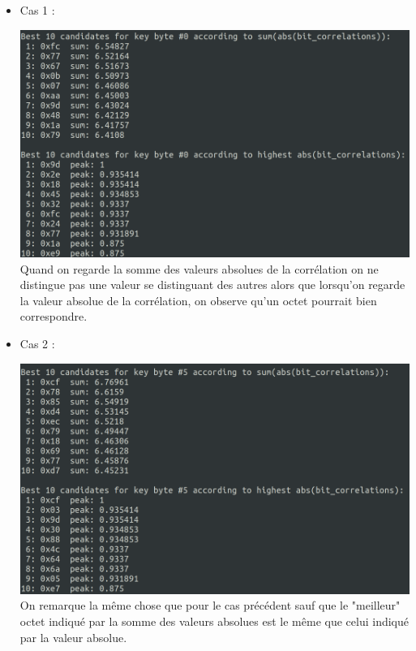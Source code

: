 \documentclass[10pt,a4paper]{article}
\begin{document}
\begin{itemize}
\item Cas 1 :\\
\begin{center}
\includegraphics[scale=0.25]{Images/Resultat_26_cas_1}\\
Quand on regarde la somme des valeurs absolues de la corrélation on ne distingue pas une valeur se distinguant des autres alors que lorsqu'on regarde la valeur absolue de la corrélation, on observe qu'un octet pourrait bien correspondre.
\end{center}

\item Cas 2 :\\
\begin{center}
\includegraphics[scale=0.25]{Images/Resultat_26_cas_2}\\
On remarque la même chose que pour le cas précédent sauf que le "meilleur" octet indiqué par la somme des valeurs absolues est le même que celui indiqué par la valeur absolue.
\end{center}


\end{itemize}
\end{document}

